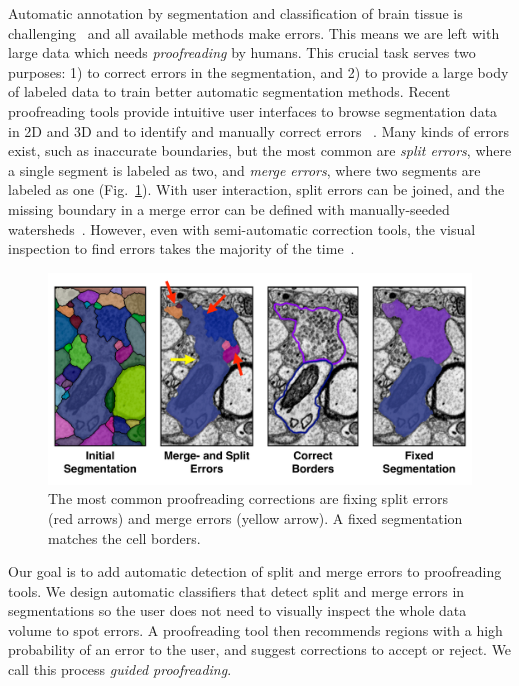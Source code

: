 Automatic annotation by segmentation and classification of brain tissue is challenging~\cite{isbi_challenge} and all available methods make errors. This means we are left with large data which needs \emph{proofreading} by humans. This crucial task serves two purposes: 1) to correct errors in the segmentation, and 2) to provide a large body of labeled data to train better automatic segmentation methods. Recent proofreading tools provide intuitive user interfaces to browse segmentation data in 2D and 3D and to identify and manually correct errors ~\cite{markus_proofreading,raveler,mojo2,haehn_dojo_2014}. Many kinds of errors exist, such as inaccurate boundaries, but the most common are \emph{split errors}, where a single segment is labeled as two, and \emph{merge errors}, where two segments are labeled as one (Fig.~\ref{fig:merge_and_slit_errors}). With user interaction, split errors can be joined, and the missing boundary in a merge error can be defined with manually-seeded watersheds~\cite{haehn_dojo_2014}. However, even with semi-automatic correction tools, the visual inspection to find errors takes the majority of the time~\cite{proofreading_bottleneck}.

\begin{figure}[t]
\begin{center}
  \includegraphics[width=\linewidth]{gfx/merge_and_split_errors.pdf}
\end{center}
\vspace{-4mm}
   \caption{The most common proofreading corrections are fixing split errors (red arrows) and merge errors (yellow arrow). A fixed segmentation matches the cell borders.}
\label{fig:merge_and_slit_errors}
\end{figure}

Our goal is to add automatic detection of split and merge errors to proofreading tools. We design automatic classifiers that detect split and merge errors in segmentations so the user does not need to visually inspect the whole data volume to spot errors. A proofreading tool then recommends regions with a high probability of an error to the user, and suggest corrections to accept or reject. We call this process \textit{guided proofreading}.

